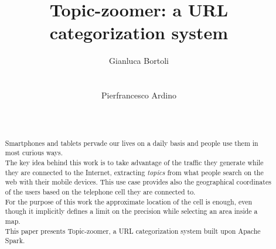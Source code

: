 \documentclass{sig-alternate-05-2015}
\begin{document}
\title{Topic-zoomer: a URL categorization system}

\author{
    \alignauthor
    Gianluca Bortoli\\
           \\
           \\
    \alignauthor
    Pierfrancesco Ardino\\
           \\
           \\
    }
\maketitle


\begin{abstract}
Smartphones and tablets pervade our lives on a daily basis and people use them in most curious ways.\\
The key idea behind this work is to take advantage of the traffic they generate while they are connected to the Internet, extracting \emph{topics} from what people search on the web with their mobile devices. This use case provides also the geographical coordinates of the users based on the telephone cell they are connected to.\\
For the purpose of this work the approximate location of the cell is enough, even though it implicitly defines a limit on the precision while selecting an area inside a map.\\
This paper presents Topic-zoomer, a URL categorization system built upon Apache Spark.
\end{abstract}


\printccsdesc
{}
\end{document}
